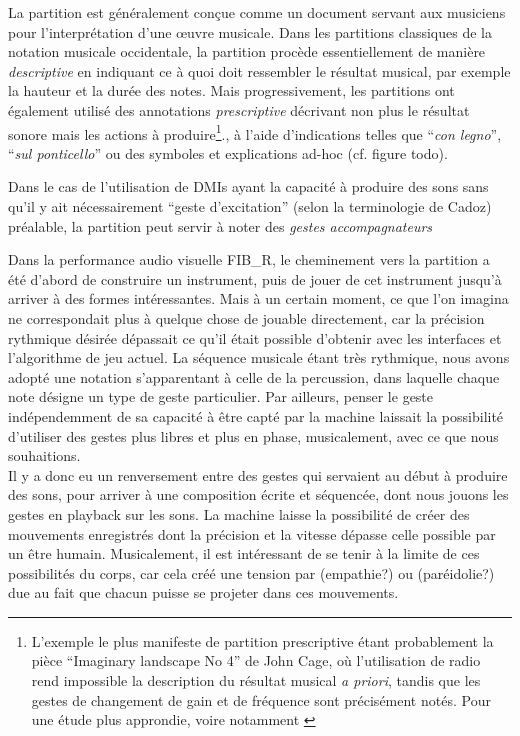 \noindent La partition est généralement conçue comme un document servant aux musiciens pour l'interprétation d'une œuvre musicale. Dans les partitions classiques de la notation musicale occidentale, la partition procède essentiellement de manière \textit{descriptive} en indiquant ce à quoi doit ressembler le résultat musical, par exemple la hauteur et la durée des notes. Mais progressivement, les partitions ont également utilisé des annotations \textit{prescriptive} décrivant non plus le résultat sonore mais les actions à produire\footnote{L'exemple le plus manifeste de partition prescriptive étant probablement la pièce ``Imaginary landscape No 4'' de John Cage, où l'utilisation de radio rend impossible la description du résultat musical \textit{a priori}, tandis que les gestes de changement de gain et de fréquence sont précisément notés. Pour une étude plus approndie, voire notamment \cite{kojs_notating_2011}}., à l'aide d'indications telles que ``\textit{con legno}'', ``\textit{sul ponticello}'' ou des symboles et explications ad-hoc (cf. figure todo).

\indent Dans le cas de l'utilisation de \glspl{DMI} ayant la capacité à produire des sons sans qu'il y ait nécessairement ``geste d'excitation'' (selon la terminologie de Cadoz) préalable, la partition peut servir à noter des \textit{gestes accompagnateurs} 

Dans la performance audio visuelle FIB\_R, le cheminement vers la partition a été d'abord de construire un instrument, puis de jouer de cet instrument jusqu'à arriver à des formes intéressantes. Mais à un certain moment, ce que l'on imagina ne correspondait plus à quelque chose de jouable directement, car la précision rythmique désirée dépassait ce qu'il était possible d'obtenir avec les interfaces et l'algorithme de jeu actuel. La séquence musicale étant très rythmique, nous avons adopté une notation s'apparentant à celle de la percussion, dans laquelle chaque note désigne un type de geste particulier.
Par ailleurs, penser le geste indépendemment de sa capacité à être capté par la machine laissait la possibilité d'utiliser des gestes plus libres et plus en phase, musicalement, avec ce que nous souhaitions.\\
Il y a donc eu un renversement entre des gestes qui servaient au début à produire des sons, pour arriver à une composition écrite et séquencée, dont nous jouons les gestes en playback sur les sons.
La machine laisse la possibilité de créer des mouvements enregistrés dont la précision et la vitesse dépasse celle possible par un être humain. Musicalement, il est intéressant de se tenir à la limite de ces possibilités du corps, car cela créé une tension par (empathie?) ou (paréidolie?) due au fait que chacun puisse se projeter dans ces mouvements.


